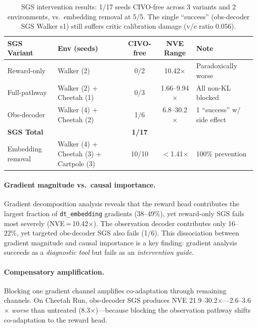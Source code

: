 \documentclass{article}
\begin{document}
\begin{table}[h]
\centering
\caption{SGS intervention results: 1/17 seeds CIVO-free across 3 variants and 2 environments, vs.\ embedding removal at 5/5.
The single ``success'' (obs-decoder SGS Walker s1) still suffers critic calibration damage (v/e ratio 0.056).}
\label{tab:sgs-summary}
\begin{tabular}{llccl}
\toprule
\textbf{SGS Variant} & \textbf{Env (seeds)} & \textbf{CIVO-free} & \textbf{NVE Range} & \textbf{Note} \\
\midrule
Reward-only & Walker (2) & 0/2 & 10.42$\times$ & Paradoxically worse \\
Full-pathway & Walker (2) + Cheetah (1) & 0/3 & 1.66--9.94$\times$ & All non-KL blocked \\
Obs-decoder & Walker (4) + Cheetah (2) & 1/6 & 6.8--30.2$\times$ & 1 ``success'' w/ side effect \\
\midrule
\textbf{SGS Total} & & \textbf{1/17} & & \\
\midrule
Embedding removal & Walker (4) + Cheetah (3) + Cartpole (3) & 10/10 & $<$1.41$\times$ & 100\% prevention \\
\bottomrule
\end{tabular}
\end{table}

\paragraph{Gradient magnitude vs.\ causal importance.}
Gradient decomposition analysis reveals that the reward head contributes the largest fraction of \texttt{dt\_embedding} gradients (38--49\%), yet reward-only SGS fails most severely (NVE\,=\,10.42$\times$).
The observation decoder contributes only 16--22\%, yet targeted obs-decoder SGS also fails (1/6).
This dissociation between gradient magnitude and causal importance is a key finding: gradient analysis succeeds as a \emph{diagnostic tool} but fails as an \emph{intervention guide}.

\paragraph{Compensatory amplification.}
Blocking one gradient channel amplifies co-adaptation through remaining channels.
On Cheetah Run, obs-decoder SGS produces NVE 21.9--30.2$\times$---2.6--3.6$\times$ \emph{worse} than untreated (8.3$\times$)---because blocking the observation pathway shifts co-adaptation to the reward head.
\end{document}
